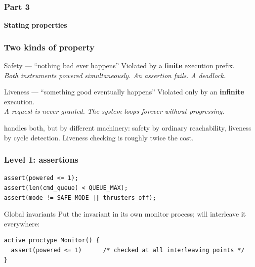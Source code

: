 \begin{frame}
  \frametitle{Part 3}

{\Large\bf Stating properties}

\end{frame}

\begin{frame}
  \frametitle{Two kinds of property} \small

\begin{block}{Safety --- ``nothing bad ever happens''}\small
Violated by a {\bf finite} execution prefix.\\
{\em Both instruments powered simultaneously. An assertion fails. A deadlock.}
\end{block}

\pause

\begin{block}{Liveness --- ``something good eventually happens''}\small
Violated only by an {\bf infinite} execution.\\
{\em A request is never granted. The system loops forever without progressing.}
\end{block}

\pause
\vspace{0.4cm}

\spin{} handles both, but by different machinery:
safety by ordinary reachability, liveness by cycle detection.
Liveness checking is roughly twice the cost.

\end{frame}

\begin{frame}[fragile]
  \frametitle{Level 1: assertions} \small

\begin{lstlisting}[language=promela]
assert(powered <= 1);
assert(len(cmd_queue) < QUEUE_MAX);
assert(mode != SAFE_MODE || thrusters_off);
\end{lstlisting}

\pause
\vspace{0.3cm}

\begin{block}{Global invariants}\small
Put the invariant in its own monitor process; \spin{} will interleave it everywhere:
\begin{lstlisting}[language=promela]
active proctype Monitor() {
  assert(powered <= 1)      /* checked at all interleaving points */
}
\end{lstlisting}
\end{block}

\end{frame}


